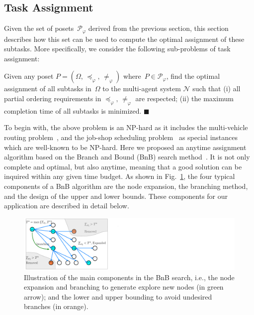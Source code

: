 \subsection{Task Assignment}\label{subsubsec:task-assignment}
Given the set of posets~$\mathcal{P}_{\varphi}$ derived from the previous
section, this section describes how this set can be used to compute
the optimal assignment of these subtasks. More specifically, we consider
the following sub-problems of task assignment:

\begin{problem}\label{problem:}
Given any poset $P=(\Omega,\, \preceq_{\varphi},\, \neq_{\varphi})$
where~$P\in \mathcal{P}_{\varphi}$,
find the optimal assignment of all subtasks in~$\Omega$ to the multi-agent system
$\mathcal{N}$ such that
(i) all partial ordering requirements in $\preceq_{\varphi},\, \neq_{\varphi}$ are
respected; (ii) the maximum completion time of all subtasks is minimized.
\hfill $\blacksquare$
\end{problem}



To begin with, the above problem is an NP-hard as it includes the multi-vehicle routing
problem~\cite{gini2017multi, khamis2015multi},
and the job-shop scheduling problem~\cite{brucker1994branch} as special instances which are
 well-known to be NP-hard. Here we proposed an anytime assignment algorithm
based on the Branch and Bound (BnB) search
method~\cite{lawler1966branch, morrison2016branch}.
It is not only complete and optimal, but also anytime, meaning that a good
solution can be inquired within any given time budget.
As shown in Fig.~\ref{fig:bnb_search_logic},
the four typical components of a BnB
algorithm are the node expansion, the branching method,
and the design of the upper and lower bounds.
These components for our application are described in detail below. 


 

\begin{figure}[t!]
	\centering
	\includegraphics[width=0.8\linewidth]{figures/bnb_graph3.pdf}
	\caption{
		Illustration of the main components in the BnB search,
		i.e., the node expansion and branching to generate explore new nodes (in green arrow);
		and the lower and upper bounding to avoid undesired branches (in orange).}
	\label{fig:bnb_search_logic}
\end{figure}



